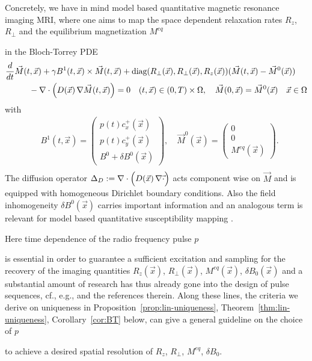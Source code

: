 \documentclass[12pt]{article}
\newcommand\skipgradient[1]{}
\newcommand\MRIdetails[1]{}
\newcommand\vecr{\vec{x}}
\begin{document}
Concretely, we have in mind model based quantitative magnetic resonance imaging MRI, where one aims to map 
the space dependent relaxation rates $R_z$, $R_\perp$ and the equilibrium magnetization $M^{eq}$ 
\MRIdetails{containing the spin density} 
in the Bloch-Torrey PDE
\begin{equation}\label{eqn:bloch-torrey}
\begin{aligned}
&    \frac{d}{dt} \vec M(t, \vecr) + \gamma B^1(t, \vecr)\times\vec M(t, \vecr)    
+ \text{diag}(R_\perp(\vecr),R_\perp(\vecr),R_z(\vecr)) ({\vec M}(t, \vecr)-{\vec M}^0(\vecr))
\\&\hspace*{1cm}
    -\nabla\cdot\Bigl(D(\vecr) \, \nabla \vec M(t, \vecr)\Bigr)
=0\quad (t,\vecr)\in (0,T)\times\Omega, \quad
{\vec M}(0, \vecr)={\vec M}^0(\vecr)\quad \vecr\in \Omega
\end{aligned}
\end{equation}
with 
\begin{equation}\label{eqn:bloch-torrey-defs}
\begin{aligned}
&B^1(t, \vecr)=
\begin{pmatrix} p(t)c^+_{x}(\vecr)\\p(t)c^+_{y}(\vecr)\\
B^0 + \delta B^0(\vecr) \skipgradient{+\vecr \cdot \vec{g}(t)}
\end{pmatrix},
\quad 
{\vec M}^0(\vecr)=   \begin{pmatrix} 0 \\ 0 \\ M^{eq}(\vecr)\end{pmatrix}.
\\
\end{aligned}
\end{equation}
The diffusion operator $\Delta_D:=\nabla\cdot\Bigl(D(\vecr) \, \nabla \vec \cdot \Bigr)$ acts component wise on $\vec{M}$ and is equipped with homogeneous Dirichlet boundary conditions.
Also the field inhomogeneity $\delta B^0(\vecr)$ carries important information and an analogous term is relevant for model based quantitative susceptibility mapping \cite{QSM}.

Here time dependence 
of the radio frequency pulse $p$ 
\skipgradient{and/or of the gradient field $\vec{g}$} 
is essential in order to guarantee a sufficient excitation and sampling for the recovery of the imaging quantities $R_z(\vecr)$, $R_\perp(\vecr)$, $M^{eq}(\vecr)$, $\delta B_0(\vecr)$
and a substantial amount of research has thus already gone into the design of pulse sequences, cf., e.g., \cite{GrafSoellradlAignerRundStollberger:2022} 
and the references therein.
Along these lines, the criteria we derive on uniqueness in  Proposition~\ref{prop:lin-uniqueness}, Theorem~\ref{thm:lin-uniqueness}, Corollary~\ref{cor:BT} below, can give a general guideline on the choice of $p$ 
\skipgradient{(and $\vec{g}$)}  
to achieve a desired spatial resolution of $R_z$, $R_\perp$, $M^{eq}$, $\delta B_0$.
\end{document}
